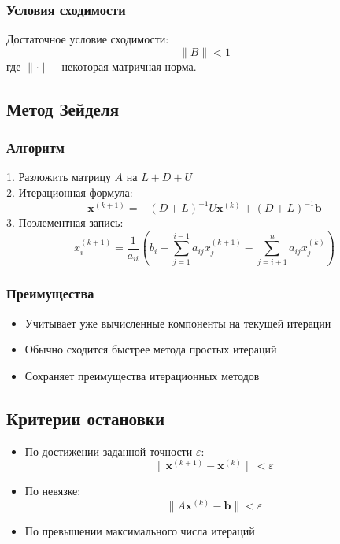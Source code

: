 \subsubsection*{Условия сходимости}
Достаточное условие сходимости:
\begin{equation}
\|B\| < 1
\end{equation}
где $\|\cdot\|$ - некоторая матричная норма.

\subsection*{Метод Зейделя}

\subsubsection*{Алгоритм}
1. Разложить матрицу $A$ на $L + D + U$ \\
2. Итерационная формула:
\begin{equation}
\mathbf{x}^{(k+1)} = -(D + L)^{-1}U\mathbf{x}^{(k)} + (D + L)^{-1}\mathbf{b}
\end{equation}
3. Поэлементная запись:
\begin{equation}
x_i^{(k+1)} = \frac{1}{a_{ii}}\left(b_i - \sum_{j=1}^{i-1}a_{ij}x_j^{(k+1)} - \sum_{j=i+1}^n a_{ij}x_j^{(k)}\right)
\end{equation}

\subsubsection*{Преимущества}
\begin{itemize}
\item Учитывает уже вычисленные компоненты на текущей итерации
\item Обычно сходится быстрее метода простых итераций
\item Сохраняет преимущества итерационных методов
\end{itemize}

\subsection*{Критерии остановки}
\begin{itemize}
\item По достижении заданной точности $\varepsilon$:
\begin{equation}
\|\mathbf{x}^{(k+1)} - \mathbf{x}^{(k)}\| < \varepsilon
\end{equation}
\item По невязке:
\begin{equation}
\|A\mathbf{x}^{(k)} - \mathbf{b}\| < \varepsilon
\end{equation}
\item По превышении максимального числа итераций
\end{itemize}


